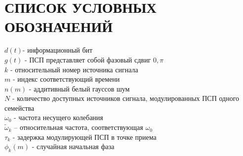 \section*{СПИСОК УСЛОВНЫХ ОБОЗНАЧЕНИЙ}
\noindent
${d(t)}$- информационный бит \\
${g(t)}$ - ПСП представляет собой фазовый сдвиг  ${0, \pi}$ \\
${k}$ - относительный номер источника сигнала	\\
${m}$ - индекс соответствующий времени	\\
${n(m)}$ - аддитивный белый гауссов шум \\
${N}$ - количество доступных источников сигнала, модулированных ПСП одного семейства \\

\noindent
${\omega_0}$ - частота несущего колебания \\
${\tilde{\omega}_{k}}$  – относительная частота, соответствующая ${\omega_0}$ \\
${\tau_k}$ - задержка модулирующей ПСП в точке приема \\
${\phi_k(m)}$ - случайная начальная фаза \\

\newpage
